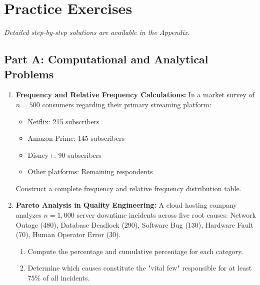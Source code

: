 \newpage
\section{Practice Exercises}
\textit{Detailed step-by-step solutions are available in the Appendix.}

\subsection*{Part A: Computational and Analytical Problems}

\begin{enumerate}
    \item \textbf{Frequency and Relative Frequency Calculations:} In a market survey of $n = 500$ consumers regarding their primary streaming platform:
    \begin{itemize}
        \item Netflix: 215 subscribers
        \item Amazon Prime: 145 subscribers
        \item Disney+: 90 subscribers
        \item Other platforms: Remaining respondents
    \end{itemize}
    Construct a complete frequency and relative frequency distribution table.

    \item \textbf{Pareto Analysis in Quality Engineering:} A cloud hosting company analyzes $n = 1{,}000$ server downtime incidents across five root causes: Network Outage (480), Database Deadlock (290), Software Bug (130), Hardware Fault (70), Human Operator Error (30).
    \begin{enumerate}
        \item Compute the percentage and cumulative percentage for each category.
        \item Determine which causes constitute the "vital few" responsible for at least $75\%$ of all incidents.
    \end{enumerate}


\end{enumerate}

